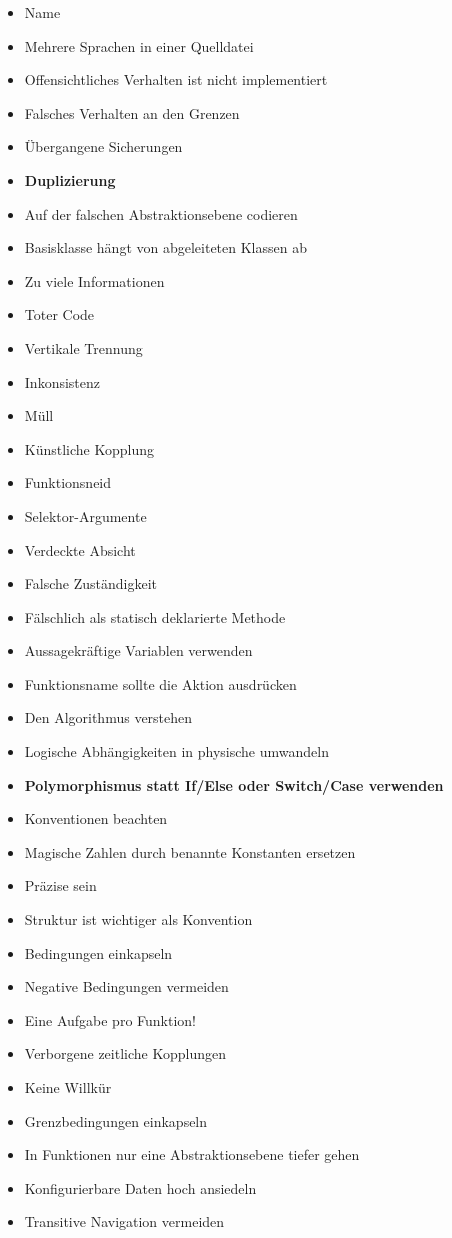 \begin{itemize}
			\item Name
			\item Mehrere Sprachen in einer Quelldatei 
			\item Offensichtliches Verhalten ist nicht implementiert 
			\item Falsches Verhalten an den Grenzen 
			\item Übergangene Sicherungen 
			\item \textbf{Duplizierung} 
			\item Auf der falschen Abstraktionsebene codieren 
			\item Basisklasse hängt von abgeleiteten Klassen ab
			\item Zu viele Informationen 
			\item Toter Code 
			\item Vertikale Trennung 
			\item Inkonsistenz 
			\item Müll 
			\item Künstliche Kopplung 
			\item Funktionsneid 
			\item Selektor-Argumente 
			\item Verdeckte Absicht 
			\item Falsche Zuständigkeit 
			\item Fälschlich als statisch deklarierte Methode 
			\item Aussagekräftige Variablen verwenden 
			\item Funktionsname sollte die Aktion ausdrücken 
			\item Den Algorithmus verstehen 
			\item Logische Abhängigkeiten in physische umwandeln 
			\item \textbf{Polymorphismus statt If/Else oder Switch/Case verwenden }
			\item Konventionen beachten 
			\item Magische Zahlen durch benannte Konstanten ersetzen 
			\item Präzise sein 
			\item Struktur ist wichtiger als Konvention 
			\item Bedingungen einkapseln 
			\item Negative Bedingungen vermeiden 
			\item Eine Aufgabe pro Funktion!
			\item Verborgene zeitliche Kopplungen 
			\item Keine Willkür 
			\item Grenzbedingungen einkapseln 
			\item In Funktionen nur eine Abstraktionsebene tiefer gehen 
			\item Konfigurierbare Daten hoch ansiedeln 
			\item Transitive Navigation vermeiden
\end{itemize}

